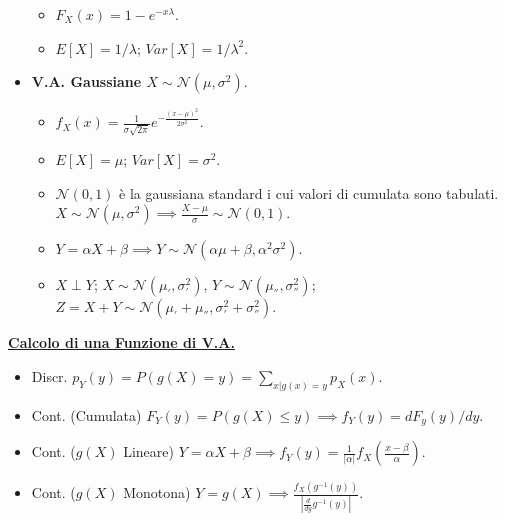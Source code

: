 \documentclass{article}
\begin{document}
\begin{multicols*}{3}
\begin{itemize}
\begin{itemize}
        \item $F_{X}(x)=1-e^{-x\lambda}$.
        \item $E[X]=1/\lambda$; $Var[X]=1/\lambda^{2}$.
    \end{itemize}
    \item \textbf{V.A. Gaussiane $X\sim\mathcal{N}(\mu,\sigma^{2})$}.
    \begin{itemize}
        \item $f_{X}(x)=\frac{1}{\sigma\sqrt{2\pi}}e^{-\frac{(x-\mu)^{2}}{2\sigma^{2}}}$.
        \item $E[X]=\mu$; $Var[X]=\sigma^{2}$.
        \item $\mathcal{N}(0,1)$ è la gaussiana standard i cui valori di cumulata sono tabulati. $X\sim\mathcal{N}(\mu, \sigma^{2})\implies \frac{X-\mu}{\sigma}\sim\mathcal{N}(0,1)$.
        \item $Y=\alpha X+\beta\implies Y\sim\mathcal{N}(\alpha\mu +\beta,\alpha^{2}\sigma^{2})$.
        \item $X\perp Y$; $X\sim\mathcal{N}(\mu_{'}, \sigma_{'}^{2})$, $Y\sim\mathcal{N}(\mu_{''}, \sigma_{''}^{2})$; $Z=X+Y\sim\mathcal{N}(\mu_{'}+\mu_{''}, \sigma_{'}^{2}+\sigma_{''}^{2})$.
    \end{itemize}
\end{itemize}
\textbf{\underline{Calcolo di una Funzione di V.A.}}
\begin{itemize}
    \item Discr. $p_{Y}(y)=P(g(X)=y)=\sum_{x|g(x)=y}p_{X}(x)$.
    \item Cont. (Cumulata) $F_{Y}(y)=P(g(X)\leq y)\implies f_{Y}(y)=dF_{y}(y)/dy$.
    \item Cont. ($g(X)$ Lineare) $Y=\alpha X+\beta\implies f_{Y}(y)=\frac{1}{|\alpha|}f_{X}(\frac{x-\beta}{\alpha})$.
    \item Cont. ($g(X)$ Monotona) $Y=g(X)\implies\frac{f_{X}(g^{-1}(y))}{|\frac{d}{dy}g^{-1}(y)|}$.
\end{itemize}

\end{multicols*}
\end{document}
